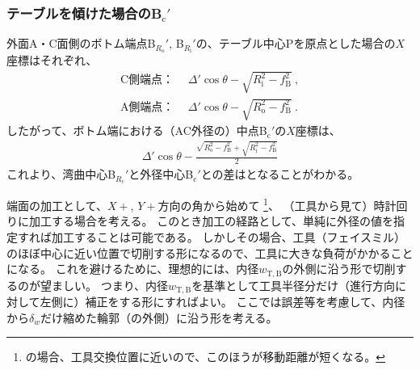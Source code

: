 \subsubsection{テーブルを傾けた場合のB\texorpdfstring{$_\mathrm c'$}{c'}}
外面A・C面側のボトム端点B$_{R_\mathrm o}'$, B$_{R_\mathrm i}'$の、テーブル中心Pを原点とした場合の$X$座標はそれぞれ、
\begin{subequations}
\begin{align}
  \label{eq:tableBRi}
  \text{C側端点：}&~~
  \varDelta'\cos\theta-\sqrt{R_\mathrm i^2-f_\mathrm B^2}\ ,\\
  \text{A側端点：}&~~
  \varDelta'\cos\theta-\sqrt{R_\mathrm o^2-f_\mathrm B^2}\ .
\end{align}
\end{subequations}
したがって、ボトム端における（AC外径の）中点B$_\mathrm c'$の$X$座標は、
\begin{align}
  \label{eq:tableBc}
  \varDelta'\cos\theta-\frac{\sqrt{R_\mathrm o^2-f_\mathrm B^2}+\sqrt{R_\mathrm i^2-f_\mathrm B^2}}2
\end{align}
これより、湾曲中心B$_{R_\mathrm c}'$と外径中心B$_\mathrm c'$との差はとなることがわかる。




\clearpage
端面の加工として、$X+$, $Y+$方向の角から始めて
\footnote{\DMname の場合、工具交換位置に近いので、このほうが移動距離が短くなる。}、
（工具から見て）時計回りに加工する場合を考える。
このとき加工の経路として、単純に外径の値を指定すれば加工することは可能である。
しかしその場合、工具（フェイスミル）のほぼ中心に近い位置で切削する形になるので、工具に大きな負荷がかかることになる。
これを避けるために、理想的には、内径$w_{\mathrm T, \mathrm B}$の外側に沿う形で切削するのが望ましい。
つまり、内径$w_{\mathrm T, \mathrm B}$を基準として工具半径分だけ（進行方向に対して左側に）補正をする形にすればよい。
ここでは誤差等を考慮して、内径から$\delta_w$だけ縮めた輪郭（の外側）に沿う形を考える。



